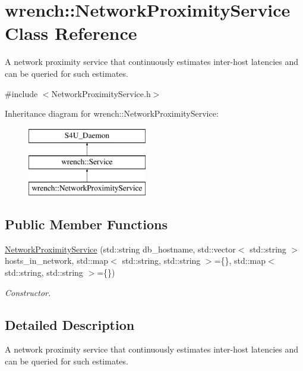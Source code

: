 \hypertarget{classwrench_1_1_network_proximity_service}{}\section{wrench\+:\+:Network\+Proximity\+Service Class Reference}
\label{classwrench_1_1_network_proximity_service}


A network proximity service that continuously estimates inter-\/host latencies and can be queried for such estimates.  




{\ttfamily \#include $<$Network\+Proximity\+Service.\+h$>$}

Inheritance diagram for wrench\+:\+:Network\+Proximity\+Service\+:\begin{figure}[H]
\begin{center}
\leavevmode
\includegraphics[height=3.000000cm]{classwrench_1_1_network_proximity_service}
\end{center}
\end{figure}
\subsection*{Public Member Functions}
\begin{DoxyCompactItemize}
\item 
\hyperlink{classwrench_1_1_network_proximity_service_a8f7021f0fd9a5a6393fc447652c2371b}{Network\+Proximity\+Service} (std\+::string db\+\_\+hostname, std\+::vector$<$ std\+::string $>$ hosts\+\_\+in\+\_\+network, std\+::map$<$ std\+::string, std\+::string $>$=\{\}, std\+::map$<$ std\+::string, std\+::string $>$=\{\})
\begin{DoxyCompactList}\small\item\em Constructor. \end{DoxyCompactList}\end{DoxyCompactItemize}


\subsection{Detailed Description}
A network proximity service that continuously estimates inter-\/host latencies and can be queried for such estimates. 

